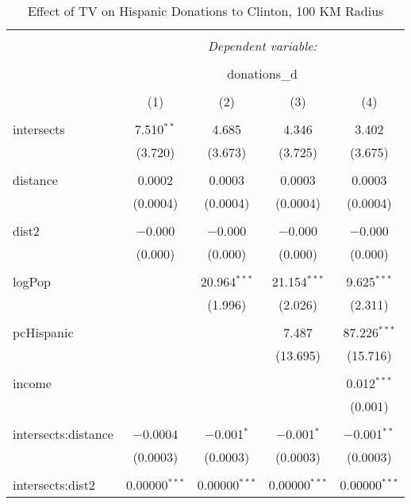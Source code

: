 
\begin{table}[!htbp] \centering 
  \caption{Effect of TV on Hispanic Donations to Clinton, 100 KM Radius} 
  \label{} 
\begin{tabular}{@{\extracolsep{-5pt}}lcccc} 
\\[-1.8ex]\hline 
\hline \\[-1.8ex] 
 & \multicolumn{4}{c}{\textit{Dependent variable:}} \\ 
\cline{2-5} 
\\[-1.8ex] & \multicolumn{4}{c}{donations\_d} \\ 
\\[-1.8ex] & (1) & (2) & (3) & (4)\\ 
\hline \\[-1.8ex] 
 intersects & 7.510$^{**}$ & 4.685 & 4.346 & 3.402 \\ 
  & (3.720) & (3.673) & (3.725) & (3.675) \\ 
  & & & & \\ 
 distance & 0.0002 & 0.0003 & 0.0003 & 0.0003 \\ 
  & (0.0004) & (0.0004) & (0.0004) & (0.0004) \\ 
  & & & & \\ 
 dist2 & $-$0.000 & $-$0.000 & $-$0.000 & $-$0.000 \\ 
  & (0.000) & (0.000) & (0.000) & (0.000) \\ 
  & & & & \\ 
 logPop &  & 20.964$^{***}$ & 21.154$^{***}$ & 9.625$^{***}$ \\ 
  &  & (1.996) & (2.026) & (2.311) \\ 
  & & & & \\ 
 pcHispanic &  &  & 7.487 & 87.226$^{***}$ \\ 
  &  &  & (13.695) & (15.716) \\ 
  & & & & \\ 
 income &  &  &  & 0.012$^{***}$ \\ 
  &  &  &  & (0.001) \\ 
  & & & & \\ 
 intersects:distance & $-$0.0004 & $-$0.001$^{*}$ & $-$0.001$^{*}$ & $-$0.001$^{**}$ \\ 
  & (0.0003) & (0.0003) & (0.0003) & (0.0003) \\ 
  & & & & \\ 
 intersects:dist2 & 0.00000$^{***}$ & 0.00000$^{***}$ & 0.00000$^{***}$ & 0.00000$^{***}$ \\ 

\end{tabular}
\end{table}
